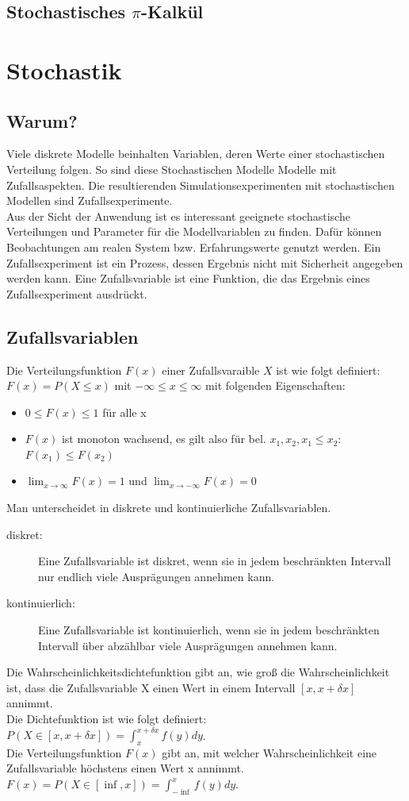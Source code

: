 \documentclass[11pt, fleqn, a4paper, leqno]{scrartcl} %
\begin{document}
	\subsection{Stochastisches $\pi$-Kalkül}
\section{Stochastik}
	\subsection{Warum?}
	Viele diskrete Modelle beinhalten Variablen, deren Werte einer stochastischen Verteilung folgen. So sind diese Stochastischen Modelle Modelle mit Zufallsaspekten. Die resultierenden Simulationsexperimenten mit stochastischen Modellen sind Zufallsexperimente.\\
	Aus der Sicht der Anwendung ist es interessant geeignete stochastische Verteilungen und Parameter für die Modellvariablen zu finden. Dafür können Beobachtungen am realen System bzw. Erfahrungswerte genutzt werden. Ein Zufallsexperiment ist ein Prozess, dessen Ergebnis nicht mit Sicherheit angegeben werden kann. Eine Zufallsvariable ist eine Funktion, die das Ergebnis eines Zufallsexperiment ausdrückt.
	\subsection{Zufallsvariablen}
	Die Verteilungsfunktion $F(x)$ einer Zufallsvaraible $X$ ist wie folgt definiert: $F(x) = P(X\leq x)$ mit $-\infty \le x \le \infty$ mit folgenden Eigenschaften:
	\begin{itemize}
		\item $0 \leq F(x) \leq 1$ für alle x
		\item $F(x)$ ist monoton wachsend, es gilt also für bel. $x_{1}, x_{2}, x_{1} \leq x_{2}$: $F(x_{1}) \leq F(x_{2})$
		\item $\lim_{x \to \infty} F(x) = 1$ und $\lim_{x \to -\infty} F(x) = 0 $
	\end{itemize}
	Man unterscheidet in diskrete und kontinuierliche Zufallsvariablen.
	\begin{description}
		\item[diskret:] Eine Zufallsvariable ist diskret, wenn sie in jedem beschränkten Intervall nur endlich viele Ausprägungen annehmen kann.
		\item[kontinuierlich:] Eine Zufallsvariable ist kontinuierlich, wenn sie in jedem beschränkten Intervall über abzählbar viele Ausprägungen annehmen kann.
	\end{description}
	Die Wahrscheinlichkeitsdichtefunktion gibt an, wie groß die Wahrscheinlichkeit ist, dass die Zufallsvariable X einen Wert in einem Intervall $[x,x+\delta x]$ annimmt.\\
	Die Dichtefunktion ist wie folgt definiert: $P(X\in[x,x+\delta x]) = \int_{x}^{x+\delta x} f(y) dy$.\\
	Die Verteilungsfunktion $F(x)$ gibt an, mit welcher Wahrscheinlichkeit eine Zufallsvariable höchstens einen Wert x annimmt. $F(x) = P(X\in[\inf,x]) = \int_{-\inf}^{x} f(y) dy$.
\end{document}
